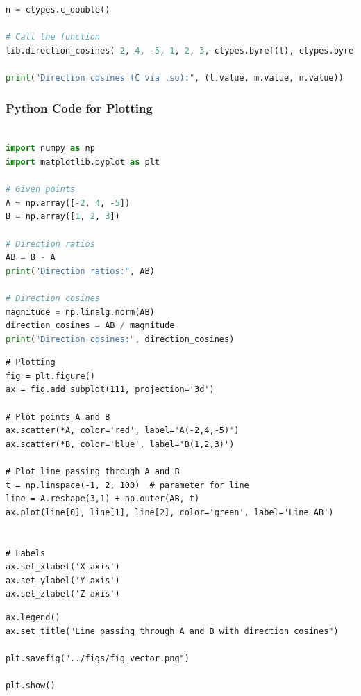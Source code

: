 \documentclass{beamer}
\theoremstyle{remark}
\numberwithin{equation}{section}
\begin{document}
\begin{frame}[fragile]
\begin{lstlisting}[language=Python]
n = ctypes.c_double()

# Call the function
lib.direction_cosines(-2, 4, -5, 1, 2, 3, ctypes.byref(l), ctypes.byref(m), ctypes.byref(n))

print("Direction cosines (C via .so):", (l.value, m.value, n.value))
    \end{lstlisting}
    \end{frame}
\begin{frame}[fragile]
\frametitle{Python Code for Plotting}
\begin{lstlisting}[language=Python]

import numpy as np
import matplotlib.pyplot as plt

# Given points
A = np.array([-2, 4, -5])
B = np.array([1, 2, 3])

# Direction ratios
AB = B - A
print("Direction ratios:", AB)

# Direction cosines
magnitude = np.linalg.norm(AB)
direction_cosines = AB / magnitude
print("Direction cosines:", direction_cosines)
\end{lstlisting}
\end{frame}
\begin{frame}[fragile]
    \begin{lstlisting}
# Plotting
fig = plt.figure()
ax = fig.add_subplot(111, projection='3d')

# Plot points A and B
ax.scatter(*A, color='red', label='A(-2,4,-5)')
ax.scatter(*B, color='blue', label='B(1,2,3)')

# Plot line passing through A and B
t = np.linspace(-1, 2, 100)  # parameter for line
line = A.reshape(3,1) + np.outer(AB, t)
ax.plot(line[0], line[1], line[2], color='green', label='Line AB')


# Labels
ax.set_xlabel('X-axis')
ax.set_ylabel('Y-axis')
ax.set_zlabel('Z-axis')
\end{lstlisting}
\end{frame}
\begin{frame}[fragile]
\begin{lstlisting}
ax.legend()
ax.set_title("Line passing through A and B with direction cosines")

plt.savefig("../figs/fig_vector.png")

plt.show()
\end{lstlisting}
\end{frame}
\end{document}
